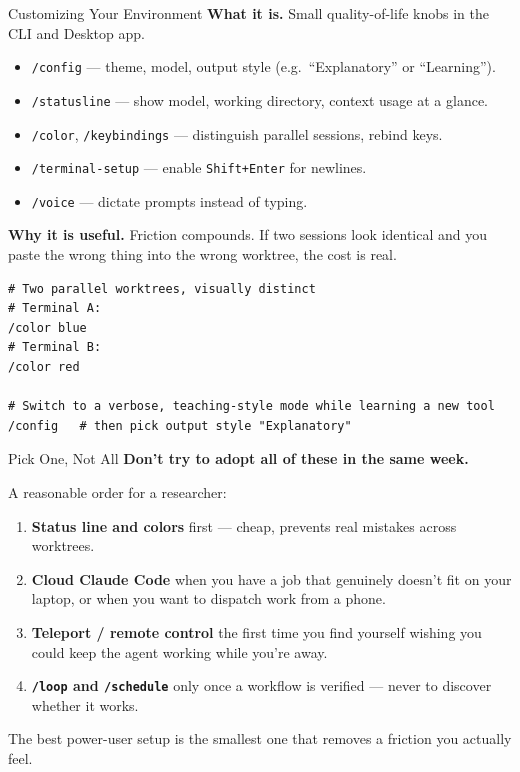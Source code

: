 \documentclass[aspectratio=169, 11pt]{beamer}
\begin{document}
\begin{frame}[fragile]{Customizing Your Environment}
  \textbf{What it is.} Small quality-of-life knobs in the CLI and Desktop app.
  \begin{itemize}\small
    \item \texttt{/config} --- theme, model, output style (e.g.\ ``Explanatory'' or ``Learning'').
    \item \texttt{/statusline} --- show model, working directory, context usage at a glance.
    \item \texttt{/color}, \texttt{/keybindings} --- distinguish parallel sessions, rebind keys.
    \item \texttt{/terminal-setup} --- enable \texttt{Shift+Enter} for newlines.
    \item \texttt{/voice} --- dictate prompts instead of typing.
  \end{itemize}

  \vspace{0.4em}
  \textbf{Why it is useful.} Friction compounds. If two sessions look identical and you paste the wrong thing into the wrong worktree, the cost is real.

  \vspace{0.3em}
  \begin{lstlisting}[basicstyle=\ttfamily\footnotesize]
# Two parallel worktrees, visually distinct
# Terminal A:
/color blue
# Terminal B:
/color red

# Switch to a verbose, teaching-style mode while learning a new tool
/config   # then pick output style "Explanatory"
  \end{lstlisting}
\end{frame}

\begin{frame}{Pick One, Not All}
  \textbf{Don't try to adopt all of these in the same week.}

  \vspace{0.6em}
  A reasonable order for a researcher:
  \begin{enumerate}\small
    \item \textbf{Status line and colors} first --- cheap, prevents real mistakes across worktrees.
    \item \textbf{Cloud Claude Code} when you have a job that genuinely doesn't fit on your laptop, or when you want to dispatch work from a phone.
    \item \textbf{Teleport / remote control} the first time you find yourself wishing you could keep the agent working while you're away.
    \item \textbf{\texttt{/loop} and \texttt{/schedule}} only once a workflow is verified --- never to discover whether it works.
  \end{enumerate}

  \vspace{0.7em}
  \alert{The best power-user setup is the smallest one that removes a friction you actually feel.}
\end{frame}
\end{document}
